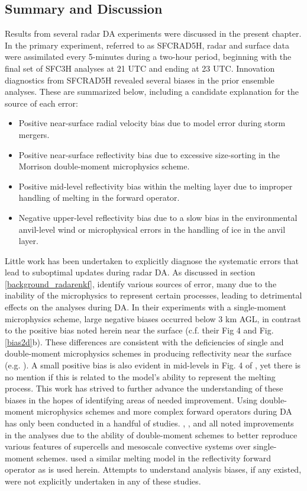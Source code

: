 \subsection{Summary and Discussion}
Results from several radar DA experiments were discussed in the present chapter. In the primary experiment, referred to as SFCRAD5H, radar and surface data were assimilated every 5-minutes during a two-hour period, beginning with the final set of SFC3H analyses at 21 UTC and ending at 23 UTC. Innovation diagnostics from SFCRAD5H revealed several biases in the prior ensemble analyses. These are summarized below, including a candidate explanation for the source of each error:

\begin{itemize}
\item Positive near-surface radial velocity bias due to model error during storm mergers.
\item Positive near-surface reflectivity bias due to excessive size-sorting in the Morrison double-moment microphysics scheme.
\item Positive mid-level reflectivity bias within the melting layer due to improper handling of melting in the forward operator.
\item Negative upper-level reflectivity bias due to a slow bias in the environmental anvil-level wind or microphysical errors in the handling of ice in the anvil layer.
\end{itemize}

Little work has been undertaken to explicitly diagnose the systematic errors that lead to suboptimal updates during radar DA. As discussed in section \ref{background_radarenkf}, \citet{dowelletal11} identify various sources of error, many due to the inability of the microphysics to represent certain processes, leading to detrimental effects on the analyses during DA. In their experiments with a single-moment microphysics scheme, large negative biases occurred below 3 km AGL, in contrast to the positive bias noted herein near the surface (c.f. their Fig 4 and Fig. \ref{bias2d}b). These differences are consistent with the deficiencies of single and double-moment microphysics schemes in producing reflectivity near the surface (e.g. \citealt{dawsonetal10,kumjianryzhkov12}). A small positive bias is also evident in mid-levels in Fig. 4 of \citet{dowelletal11}, yet there is no mention if this is related to the model's ability to represent the melting process. This work has strived to further advance the understanding of these biases in the hopes of identifying areas of needed improvement. Using double-moment microphysics schemes and more complex forward operators during DA has only been conducted in a handful of studies. \citet{jungetal12}, \citet{putnametal13}, and \citet{yussoufetal13} all noted improvements in the analyses due to the ability of double-moment schemes to better reproduce various features of supercells and mesoscale convective systems over single-moment schemes. \citet{jungetal12} used a similar melting model in the reflectivity forward operator as is used herein. Attempts to understand analysis biases, if any existed, were not explicitly undertaken in any of these studies.

